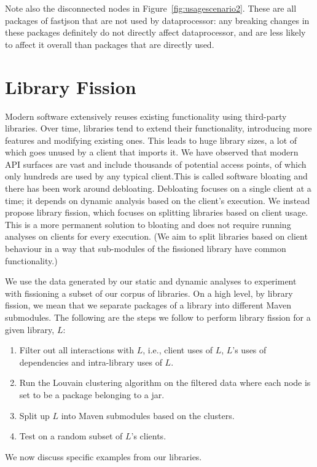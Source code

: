 Note also the disconnected nodes in Figure~\ref{fig:usagescenario2}. These are all packages of fastjson that are not used by dataprocessor: any breaking changes in these packages definitely do not directly affect dataprocessor, and are less likely to affect it overall than packages that are directly used.

\section{Library Fission}
Modern software extensively reuses existing functionality using third-party libraries. Over time, libraries tend to extend their functionality, introducing more features and modifying existing ones. This leads to huge library sizes, a lot of which goes unused by a client that imports it. We have observed that modern API surfaces are vast and include thousands of potential access points, of which only hundreds are used by any typical client.This is called software bloating and there has been work around debloating. Debloating focuses on a single client at a time; it depends on dynamic analysis based on the client’s execution. We instead propose library fission, which focuses on splitting libraries based on client usage. This is a more permanent solution to bloating and does not require running analyses on clients for every execution. (We aim to split libraries based on client behaviour in a way that sub-modules of the fissioned library have common functionality.) 

We use the data generated by our static and dynamic analyses to experiment with fissioning a subset of our corpus of libraries. On a high level, by library fission, we mean that we separate packages of a library into different Maven submodules. The following are the steps we follow to perform library fission for a given library, $L$:
\begin{enumerate}
\item Filter out all interactions with $L$, i.e., client uses of $L$, $L$'s uses of dependencies and intra-library uses of $L$.
\item Run the Louvain clustering algorithm on the filtered data where each node is set to be a package belonging to a jar.
\item Split up $L$ into Maven submodules based on the clusters.
\item Test on a random subset of $L$'s clients.
\end{enumerate}

We now discuss specific examples from our libraries.

